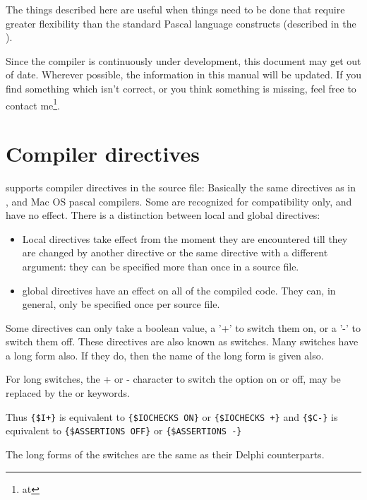 The things described here are useful when things need to be done that
require greater flexibility than the standard Pascal language constructs
(described in the ).

Since the compiler is continuously under development, this document may get
out of date. Wherever possible, the information in this manual will be
updated. If you find something which isn't correct, or you think something
 is missing, feel free to contact me\footnote{at
}.

\chapter{Compiler directives}
\label{ch:CompSwitch}

\fpc supports compiler directives in the source file: Basically the same
directives as in \tp, \delphi and Mac OS pascal compilers.
Some are recognized for compatibility only, and have no effect.
There is a distinction between local and global directives:
\begin{itemize}
\item Local directives take effect from the moment they are encountered till
they are changed by another directive or the same directive with a different
argument: they can be specified more than once in a source file.
\item global directives have an effect on all of the compiled code. They
can, in general, only be specified once per source file.
\end{itemize}

Some directives can only take a boolean value, a '+' to switch them on,
or a '-' to switch them off. These directives are also known as switches.
Many switches have a long form also. If they do, then the name of the
long form is given also. 

For long switches, the + or - character to switch the option on or off, 
may be replaced by the  or  keywords.

Thus \verb|{$I+}| is equivalent to \verb|{$IOCHECKS ON}| or
\verb|{$IOCHECKS +}| and
\verb|{$C-}| is equivalent to \verb|{$ASSERTIONS OFF}| or
\verb|{$ASSERTIONS -}|

The long forms of the switches are the same as their Delphi
counterparts.

